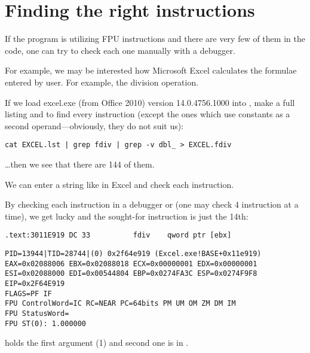 \section{Finding the right instructions}

If the program is utilizing FPU instructions and there are very few of them in the code,
one can try to check each one manually with a debugger.

\par For example, we may be interested how Microsoft Excel calculates the formulae entered by user.
For example, the division operation.

\myindex{\GrepUsage}

If we load excel.exe (from Office 2010) version 14.0.4756.1000 into \IDA, make a full listing
and to find every \FDIV instruction (except the ones which use constants as a second 
operand---obviously, they do not suit us):

\begin{lstlisting}
cat EXCEL.lst | grep fdiv | grep -v dbl_ > EXCEL.fdiv
\end{lstlisting}

\dots then we see that there are 144 of them.

\par We can enter a string like  in Excel and check each instruction.


\par By checking each instruction in a debugger or \tracer
(one may check 4 instruction at a time),
we get lucky and the sought-for instruction is just the 14th:

\begin{lstlisting}[style=customasm]
.text:3011E919 DC 33          fdiv    qword ptr [ebx]
\end{lstlisting}

\begin{lstlisting}
PID=13944|TID=28744|(0) 0x2f64e919 (Excel.exe!BASE+0x11e919)
EAX=0x02088006 EBX=0x02088018 ECX=0x00000001 EDX=0x00000001
ESI=0x02088000 EDI=0x00544804 EBP=0x0274FA3C ESP=0x0274F9F8
EIP=0x2F64E919
FLAGS=PF IF
FPU ControlWord=IC RC=NEAR PC=64bits PM UM OM ZM DM IM 
FPU StatusWord=
FPU ST(0): 1.000000
\end{lstlisting}

 holds the first argument (1) and second one is in \TT{[EBX]}.\\
\\

